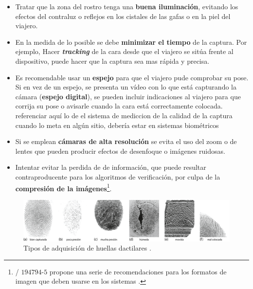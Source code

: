 \begin{itemize}
    \item
    Tratar que la zona del rostro tenga una \textbf{buena iluminación}, evitando los efectos del contraluz o reflejos en los cistales de las gafas o en la piel del viajero.
    
    \item
    En la medida de lo posible se debe \textbf{minimizar el tiempo} de la captura. Por ejemplo, Hacer \textbf{\textit{tracking}} de la cara desde que el viajero se sitúa frente al dispositivo, puede hacer que la captura sea mas rápida y precisa. 
    
    \item
    Es recomendable usar un \textbf{espejo} para que el viajero pude comprobar su pose. Si en vez de un espejo, se presenta un vídeo con lo que está capturando la cámara (\textbf{espejo digital}), se pueden incluir indicaciones al viajero para que corrija su pose o avisarle cuando la cara está correctamente colocada. \color{cyan} referenciar aquí lo de el sistema de mediccion de la calidad de la captura cuando lo meta en algún sitio, debería estar en sistemas biométricos \color{black} 
    
    \item 
    Si se emplean \textbf{cámaras de alta resolución} se evita el uso del zoom o de lentes que pueden producir efectos de desenfoque o imágenes ruidosas.  
    
    \item
    Intentar evitar la perdida de de información, que puede resultar contraproducente para los algoritmos de verificación, por culpa de la \textbf{compresión de la imágenes}\footnote{/ $194794$-$5$ \cite{ISO/BioApi} propone una serie de recomendaciones para los formatos de imagen que deben usarse en los sistemas .}.
\end{itemize}

\begin{figure}[t]
    \centering
    \includegraphics[width=1\linewidth]{ch-sistemasABC/images/ch-biometricosABC/adquisicionesDactilares.png}
    \caption{Tipos de adquisición de huellas dactilares \cite{ted2008biometric}.}
    \label{fig:AdquisicionDactilares}
\end{figure}



